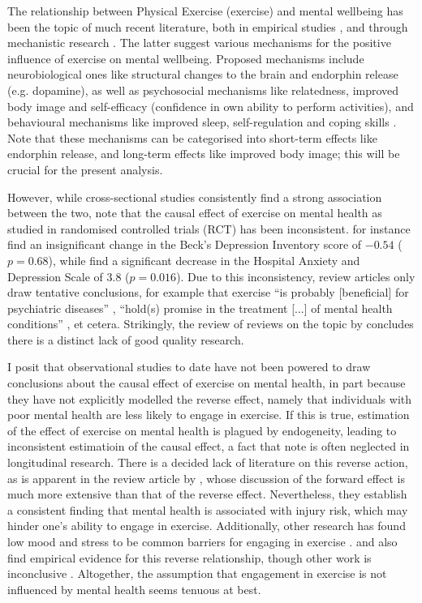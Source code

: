 The relationship between Physical Exercise (exercise) and mental wellbeing has been the topic of much recent literature,
both in empirical studies \cite{noetel2024effect, mahindru2023role}, and through mechanistic research \cite{smith2021role, lubans2016physical}.
The latter suggest various mechanisms for the positive influence of exercise on mental wellbeing.
Proposed mechanisms include neurobiological ones like structural changes to the brain and endorphin release (e.g. dopamine),
as well as psychosocial mechanisms like relatedness, improved body image and self-efficacy (confidence in own ability to perform activities),
and behavioural mechanisms like improved sleep, self-regulation and coping skills \cite{lubans2016physical}.
Note that these mechanisms can be categorised into short-term effects like endorphin release, and long-term effects
like improved body image; this will be crucial for the present analysis.

However, while cross-sectional studies consistently find a strong association between the two, 
note that the causal effect of exercise on mental health as studied in randomised controlled trials (RCT) has been inconsistent.
 for instance find an insignificant change in the Beck's Depression Inventory score
of $-0.54$ ($p = 0.68$), while  find a significant decrease in the Hospital Anxiety and
Depression Scale of $3.8$ ($p = 0.016$).
Due to this inconsistency, review articles only draw tentative conclusions, for example that exercise ``is probably [beneficial]
for psychiatric diseases'' \cite{peluso2005physical}, ``hold(s) promise in the treatment [...] of mental health conditions''
\cite{smith2021role}, et cetera.
Strikingly, the review of reviews on the topic by  concludes there is a distinct lack of good quality research.

I posit that observational studies to date have not been powered to draw conclusions about the causal effect
of exercise on mental health, in part because they have not explicitly modelled the reverse effect, namely that individuals with poor
mental health are less likely to engage in exercise. If this is true, estimation of the effect of exercise on mental health is
plagued by endogeneity, leading to inconsistent estimatioin of the causal effect, a fact that  note is often neglected in
longitudinal research.
There is a decided lack of literature on this reverse action, as is apparent in the review article by ,
whose discussion of the forward effect is much more extensive than that of the reverse effect.
Nevertheless, they establish a consistent finding that mental health is associated with injury risk, which may hinder
one's ability to engage in exercise. Additionally, other research has found low mood and stress to be common barriers for
engaging in exercise \cite{firth2016motivating}.
 and  also find empirical evidence for this reverse relationship,
though other work is inconclusive \cite{birkeland2009longitudinal, ku2012physical}. Altogether, the assumption that engagement
in exercise is not influenced by mental health seems tenuous at best.

